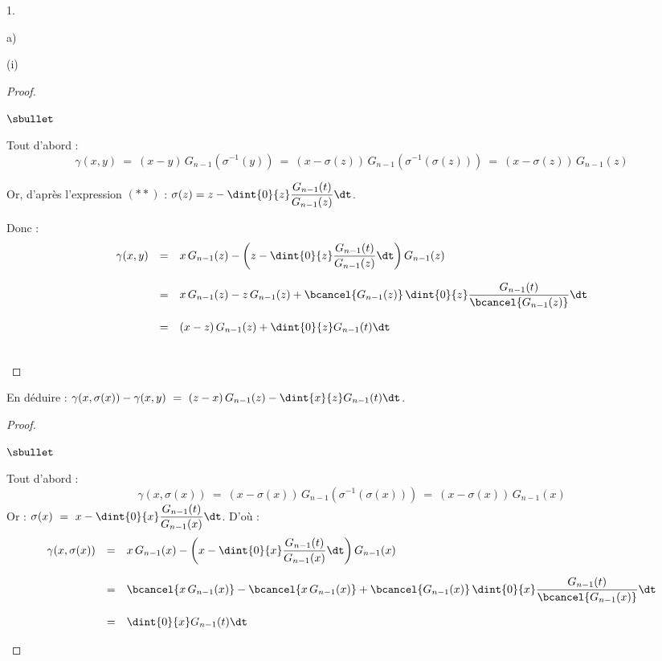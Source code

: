 \begin{noliste}{1.}
\begin{noliste}{a)}
\begin{nonoliste}{(i)}
      \begin{proof}~
	\begin{noliste}{$\sbullet$}
	  \item Tout d'abord :
	  \[
	    \gamma(x,y) \ = \ (x-y) \, G_{n-1}(\sigma^{-1}(y))
	    \ = \ (x- \sigma(z)) \, G_{n-1}(\sigma^{-1}(\sigma(z)))
	    \ = \ (x-\sigma(z)) \, G_{n-1}(z)
	  \]
	  
	  \item Or, d'après l'expression $(**)$ : $\sigma(z) = 
	  z - \dint{0}{z} \dfrac{G_{n-1}(t)}{G_{n-1}(z)} \dt$.
	  
	  \item Donc :
	  \[
	    \begin{array}{rcl}
	      \gamma(x,y) & = & x \, G_{n-1}(z) - \left(z - \dint{0}{z}
	      \dfrac{G_{n-1}(t)}{G_{n-1}(z)} \dt\right) G_{n-1}(z)
	      \\[.6cm]
	      & = & x \, G_{n-1}(z) - z \, G_{n-1}(z) + 
	      \bcancel{G_{n-1}(z)} \, \dint{0}{z} \dfrac{G_{n-1}(t)}
	      {\bcancel{G_{n-1}(z)}} \dt
	      \\[.6cm]
	      & = & (x-z) \, G_{n-1}(z) + \dint{0}{z} G_{n-1}(t) \dt
	    \end{array}
	  \]
	\end{noliste}
	~\\[-1cm]
      \end{proof}
      
      \item En déduire : $\gamma(x, \sigma(x)) - \gamma(x,y) \ = \
      (z-x) \, G_{n-1}(z) - \dint{x}{z} G_{n-1}(t) \dt$.
      
      \begin{proof}~
        \begin{noliste}{$\sbullet$}
	  \item Tout d'abord :
	  \[
	    \gamma(x, \sigma(x)) \ = \ (x - \sigma(x)) \, G_{n-1}(
	    \sigma^{-1}(\sigma(x))) \ = \ (x- \sigma(x)) \, G_{n-1}(x)
	  \]
	  Or : $\sigma(x) \ = \ x - \dint{0}{x} \dfrac{G_{n-1}(t)}
	  {G_{n-1}(x)} \dt$. D'où :
	  \[
	    \begin{array}{rcl}
	      \gamma(x,\sigma(x)) & = & x \, G_{n-1}(x) - \left(x - 
	      \dint{0}{x}
	      \dfrac{G_{n-1}(t)}{G_{n-1}(x)} \dt\right) G_{n-1}(x)
	      \\[.6cm]
	      & = & \bcancel{x \, G_{n-1}(x)} - \bcancel{x \, G_{n-1}(x)} 
	      + 
	      \bcancel{G_{n-1}(x)} \, \dint{0}{x} \dfrac{G_{n-1}(t)}
	      {\bcancel{G_{n-1}(x)}} \dt
	      \\[.6cm]
	      & = & \dint{0}{x} G_{n-1}(t) \dt
	    \end{array}
	  \]
	  

\end{noliste}
\end{proof}
\end{nonoliste}
\end{noliste}
\end{noliste}
